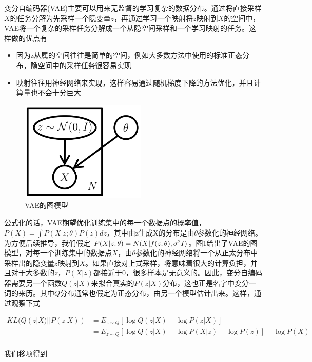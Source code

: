 \documentclass[UTF8,openany,AutoFakeBold,AutoFakeSlant,cs4size]{ctexbook}
\begin{document}
变分自编码器(VAE)主要可以用来无监督的学习复杂的数据分布。通过将直接采样$X$的任务分解为先采样一个隐变量$z$，再通过学习一个映射将$z$映射到$X$的空间中，VAE将一个复杂的采样任务分解成一个从隐空间采样和一个学习映射的任务。这样做的优点有
\begin{itemize}
	\item 因为z从属的空间往往是简单的空间，例如大多数方法中使用的标准正态分布，隐空间中的采样任务很容易实现
	\item 映射往往用神经网络来实现，这样容易通过随机梯度下降的方法优化，并且计算量也不会十分巨大
\end{itemize}

\begin{figure}[h]
\centering
\includegraphics[width=6cm]{./images/vae_model.png}
\caption{VAE的图模型}
\label{fig:sample}
\end{figure}

公式化的话，VAE期望优化训练集中的每一个数据点的概率值，$P(X) = \int P(X | z; \theta) P(z) dz$，其中由z生成X的分布是由$\theta$参数化的神经网络。为方便后续推导，我们假定 $P(X | z; \theta) = N(X | f(z; \theta), \sigma^2 \* I)$。图1给出了VAE的图模型，对每一个训练集中的数据点$X$，由$\theta$参数化的神经网络将一个从正太分布中采样出的隐变量$z$映射到$X$。如果直接对上式采样，将意味着很大的计算负担，并且对于大多数的$z$，$P(X|z)$都接近于$0$，很多样本是无意义的。因此，变分自编码器需要另一个函数$Q(z|X)$来拟合真实的$P(z|X)$分布，这也正是名字中变分一词的来历。其中$Q$分布通常也假定为正态分布，由另一个模型估计出来。这样，通过观察下式

\begin{equation}
	\begin{aligned}
		KL(Q(z|X) ||P(z|X)) &= E_{z \sim Q}[\log Q(z|X) - \log P(z | X)] \\
		&= E_{z \sim Q}[\log Q(z|X) - \log P(X | z) - \log P(z)] + \log P(X) \\
	\end{aligned}
\end{equation}

我们移项得到
\end{document}
